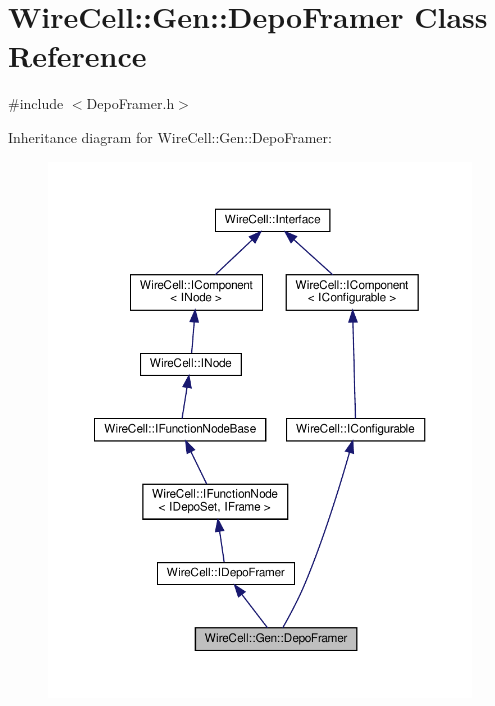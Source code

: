 \hypertarget{class_wire_cell_1_1_gen_1_1_depo_framer}{}\section{Wire\+Cell\+:\+:Gen\+:\+:Depo\+Framer Class Reference}
\label{class_wire_cell_1_1_gen_1_1_depo_framer}


{\ttfamily \#include $<$Depo\+Framer.\+h$>$}



Inheritance diagram for Wire\+Cell\+:\+:Gen\+:\+:Depo\+Framer\+:
\nopagebreak
\begin{figure}[H]
\begin{center}
\leavevmode
\includegraphics[width=350pt]{class_wire_cell_1_1_gen_1_1_depo_framer__inherit__graph}
\end{center}
\end{figure}


